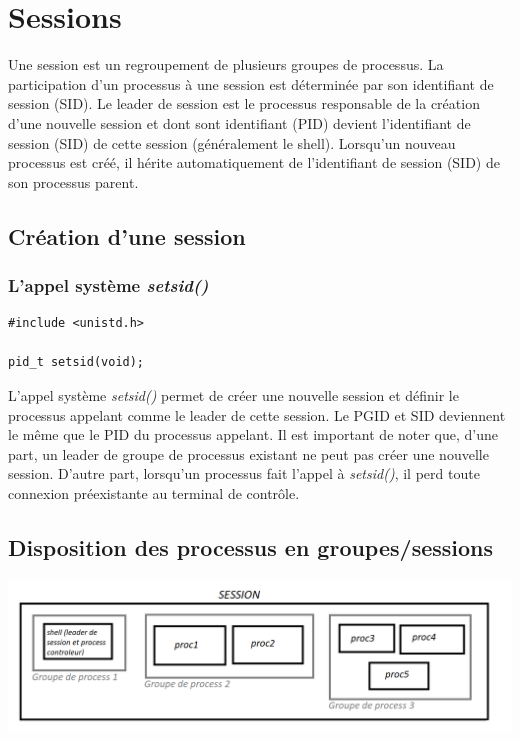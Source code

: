 \section{Sessions}
Une session est un regroupement de plusieurs groupes de processus. La participation d'un processus à une session est déterminée par son identifiant de session (SID). Le leader de session est le processus responsable de la création d'une nouvelle session et dont sont identifiant (PID) devient l'identifiant de session (SID) de cette session (généralement le shell). Lorsqu'un nouveau processus est créé, il hérite automatiquement de l'identifiant de session (SID) de son processus parent.

\subsection{Création d’une session}

\subsubsection{L’appel système \textit{setsid()} }

\begin{lstlisting}[frame=single]
#include <unistd.h>

pid_t setsid(void);
\end{lstlisting}

L’appel système \textit{setsid()} permet de créer une nouvelle session et définir le processus appelant comme le leader de cette session. Le PGID et SID deviennent le même que le PID du processus appelant.
Il est important de noter que, d'une part, un leader de groupe de processus existant ne peut pas créer une nouvelle session. D'autre part, lorsqu'un processus fait l'appel à \textit{setsid()}, il perd toute connexion préexistante au terminal de contrôle.

\subsection{Disposition des processus en groupes/sessions}

\includegraphics[width=1\textwidth]{img/SessionEtGroupes.png}